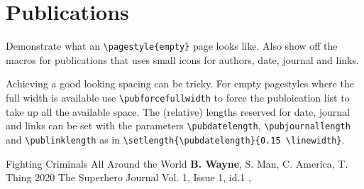 \documentclass[singlesided,
               paper=a4,
               fontsize=10pt
              ]{my-resume}
\begin{document}
\clearpage
\pagestyle{empty}

\section{Publications}
\pubforcefullwidth

Demonstrate what an \texttt{\textbackslash pagestyle\{empty\}} page looks like.
Also show off the macros for publications that uses small icons for authors, date, journal and links.

Achieving a good looking spacing can be tricky. For empty pagestyles where the full width is available use \texttt{\textbackslash pubforcefullwidth} to force the publoication list to take up all the available space.
The (relative) lengths reserved for date, journal and links can be set with the parameters \texttt{\textbackslash pubdatelength}, \texttt{\textbackslash pubjournallength} and \texttt{\textbackslash publinklength} as in \texttt{\textbackslash setlength\{\textbackslash pubdatelength\}\{0.15 \textbackslash linewidth\}}.
\bigskip

\publication
	{Fighting Criminals All Around the World} %
	{\textbf{B. Wayne}, S. Man, C. America, T. Thing} %
	{2020} %
	{The Superhero Journal Vol. 1, Issue 1, id.1} %
	{, } %
\end{document}
